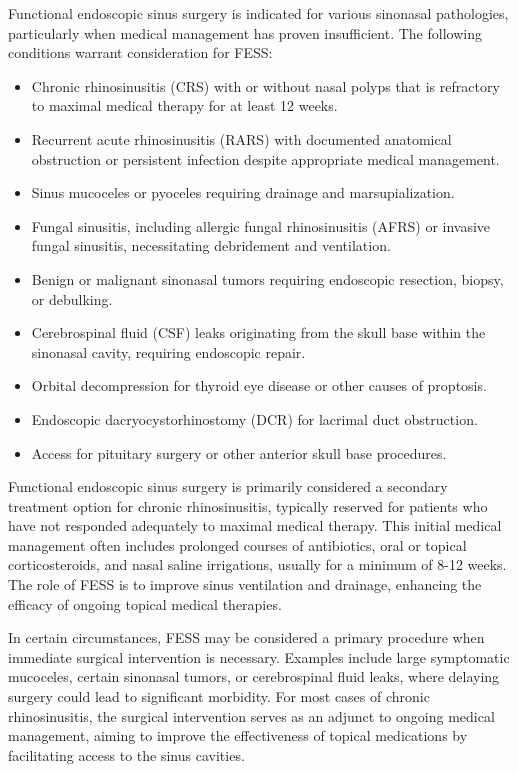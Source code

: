 Functional endoscopic sinus surgery is indicated for various sinonasal pathologies, particularly when medical management has proven insufficient. The following conditions warrant consideration for FESS:

\begin{itemize}
  \item Chronic rhinosinusitis (CRS) with or without nasal polyps that is refractory to maximal medical therapy for at least 12 weeks.
  \item Recurrent acute rhinosinusitis (RARS) with documented anatomical obstruction or persistent infection despite appropriate medical management.
  \item Sinus mucoceles or pyoceles requiring drainage and marsupialization.
  \item Fungal sinusitis, including allergic fungal rhinosinusitis (AFRS) or invasive fungal sinusitis, necessitating debridement and ventilation.
  \item Benign or malignant sinonasal tumors requiring endoscopic resection, biopsy, or debulking.
  \item Cerebrospinal fluid (CSF) leaks originating from the skull base within the sinonasal cavity, requiring endoscopic repair.
  \item Orbital decompression for thyroid eye disease or other causes of proptosis.
  \item Endoscopic dacryocystorhinostomy (DCR) for lacrimal duct obstruction.
  \item Access for pituitary surgery or other anterior skull base procedures.
\end{itemize}

Functional endoscopic sinus surgery is primarily considered a secondary treatment option for chronic rhinosinusitis, typically reserved for patients who have not responded adequately to maximal medical therapy. This initial medical management often includes prolonged courses of antibiotics, oral or topical corticosteroids, and nasal saline irrigations, usually for a minimum of 8-12 weeks. The role of FESS is to improve sinus ventilation and drainage, enhancing the efficacy of ongoing topical medical therapies.

In certain circumstances, FESS may be considered a primary procedure when immediate surgical intervention is necessary. Examples include large symptomatic mucoceles, certain sinonasal tumors, or cerebrospinal fluid leaks, where delaying surgery could lead to significant morbidity. For most cases of chronic rhinosinusitis, the surgical intervention serves as an adjunct to ongoing medical management, aiming to improve the effectiveness of topical medications by facilitating access to the sinus cavities.


